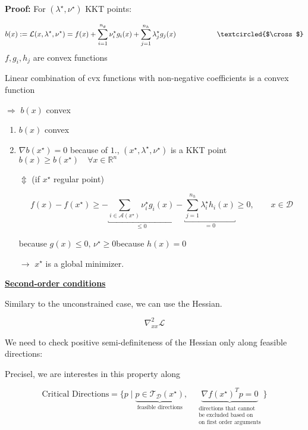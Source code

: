 \documentclass[12pt,a4paper,oneside]{scrartcl}
\begin{document}
	\textbf{Proof:} For $(\lambda^\star,\nu^\star)$ KKT points:
	
	\[
		b(x):=\mathcal{L}(x,\lambda^\star,\nu^\star)=f(x)+\sum_{i=1}^{n_g}\nu_i^\star g_i(x)+\sum_{j=1}^{n_h}\lambda_j^\star g_j(x)\hspace*{2cm} \textcircled{$\cross$}
	\]
	$f,g_i,h_j$ are convex functions
	
	Linear combination of cvx functions with non-negative coefficients is a convex function
	
	\hspace*{2cm}$\Rightarrow$ $b(x)$ convex
	
	\begin{enumerate}
		\item $b(x)$ convex
		\item $\nabla b(x^\star)=0$ because of $1.$, $(x^\star,\lambda^\star,\nu^\star)$ is a KKT point $b(x)\geq b(x^\star)\quad\forall x\in\mathbb{R}^n$
		
		\hspace*{5cm}$\Updownarrow$ (if $x^\star$ regular point)
		
		\[
			f(x)-f(x^\star)\geq-\underset{\leq0}{\underbracket{\sum_{i\in\mathcal{A}(x^\star)}\nu_i^\star g_i(x)}}-\underset{=0}{\underbracket{\sum_{j=1}^{n_h}\lambda_i^\star h_i(x)}}\geq0,\qquad x\in\mathcal{D}
		\]
		
		\hspace*{2.8cm}because $g(x)\leq0,\,\nu^\star\geq0$\hspace*{0.8cm}because $h(x)=0$
		
		$\to$ $x^\star$ is a global minimizer.\hfill\qedsymbol{}
	\end{enumerate}
	
	\underline{\textbf{Second-order conditions}}
	
	Similary to the unconstrained case, we can use the Hessian.
	
	\[
		\nabla_{xx}^2\mathcal{L}
	\]
	
	We need to check positive semi-definiteness of the Hessian only along feasible directions:
	
	Precisel, we are interestes in this property along
	
	\[
		\text{Critical Directions}=\{p\mid \underset{\text{feasible directions}}{\underbrace{p\in\mathcal{T}_\mathcal{D}(x^\star)}},\quad\underset{\substack{\text{directions that cannot}\\\text{be excluded based on}\\\text{on first order arguments}}}{\underbrace{\nabla f(x^\star)^Tp=0}}\}
	\]
	
\end{document}
